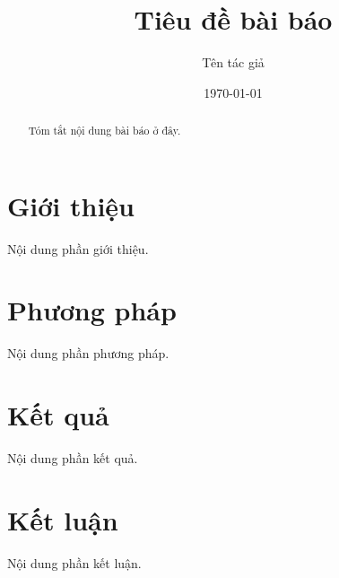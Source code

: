 \documentclass[twocolumn]{article}
\title{Tiêu đề bài báo}
\author{Tên tác giả}
\date{\today}
\begin{document}
\maketitle

\begin{abstract}
Tóm tắt nội dung bài báo ở đây.
\end{abstract}

\section{Giới thiệu}
Nội dung phần giới thiệu.

\section{Phương pháp}
Nội dung phần phương pháp.

\section{Kết quả}
Nội dung phần kết quả.

\section{Kết luận}
Nội dung phần kết luận.
\end{document}
